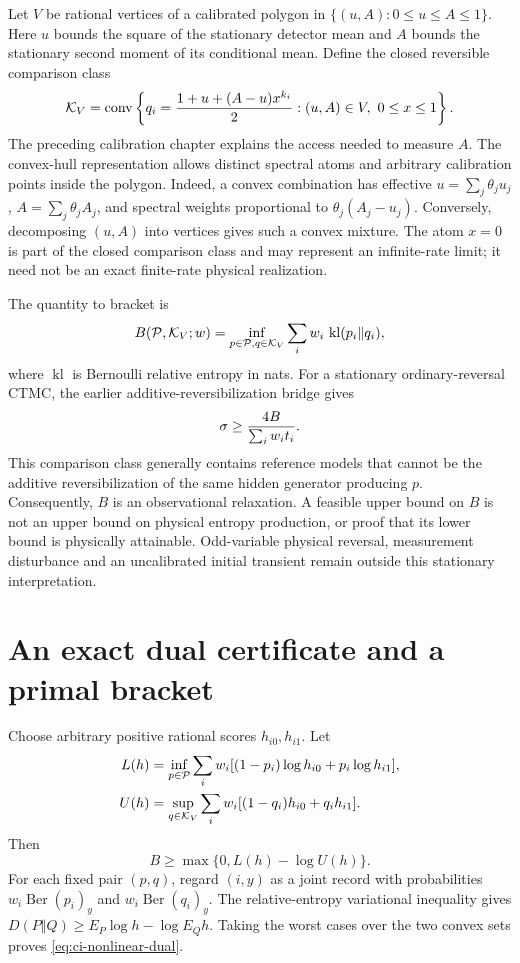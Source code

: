 Let $V$ be rational vertices of a calibrated polygon in
$\{(u,A):0\le u\le A\le1\}$. Here $u$ bounds the square of the stationary
detector mean and $A$ bounds the stationary second moment of its conditional
mean. Define the closed reversible comparison class
\[
 {\cal K}_V=\operatorname{conv}\left\{
  q_i={1+u+(A-u)x^{k_i}\over2}:(u,A)\in V,\ 0\le x\le1\right\}.
\]
The preceding calibration chapter explains the access needed to measure $A$.
The convex-hull representation allows distinct spectral atoms and arbitrary
calibration points inside the polygon. Indeed, a convex combination has
effective $u=\sum_j\theta_j u_j$, $A=\sum_j\theta_j A_j$, and spectral weights
proportional to $\theta_j(A_j-u_j)$. Conversely, decomposing $(u,A)$ into
vertices gives such a convex mixture. The atom $x=0$ is part of the closed
comparison class and may represent an infinite-rate limit; it need not be
an exact finite-rate physical realization.

The quantity to bracket is
\begin{equation}
 B({\cal P},{\cal K}_V;w)=
 \inf_{p\in{\cal P},q\in{\cal K}_V}
       \sum_i w_i\,\operatorname{kl}(p_i\Vert q_i),
 \label{eq:ci-nonlinear-projection}
\end{equation}
where $\operatorname{kl}$ is Bernoulli relative entropy in nats. For a
stationary ordinary-reversal CTMC, the earlier additive-reversibilization
bridge gives
\[
 \sigma\ge {4B\over\sum_iw_it_i}.
\]
This comparison class generally contains reference models that cannot be the
additive reversibilization of the same hidden generator producing $p$.
Consequently, $B$ is an observational relaxation. A feasible upper bound on
$B$ is not an upper bound on physical entropy production, or proof that its
lower bound is physically attainable. Odd-variable physical reversal,
measurement disturbance and an uncalibrated initial transient remain outside
this stationary interpretation.

\section{An exact dual certificate and a primal bracket}
Choose arbitrary positive rational scores $h_{i0},h_{i1}$. Let
\begin{align*}
 L(h)&=\inf_{p\in{\cal P}}\sum_iw_i
       [(1-p_i)\log h_{i0}+p_i\log h_{i1}],\\
 U(h)&=\sup_{q\in{\cal K}_V}\sum_iw_i
       [(1-q_i)h_{i0}+q_i h_{i1}].
\end{align*}
Then
\begin{equation}
 B\ge\max\{0,L(h)-\log U(h)\}.
 \label{eq:ci-nonlinear-dual}
\end{equation}
For each fixed pair $(p,q)$, regard $(i,y)$ as a joint record with probabilities
$w_i\operatorname{Ber}(p_i)_y$ and $w_i\operatorname{Ber}(q_i)_y$.
The relative-entropy variational inequality gives
$D(P\Vert Q)\ge E_P\log h-\log E_Qh$.
Taking the worst cases over the two convex sets proves
\eqref{eq:ci-nonlinear-dual}.

